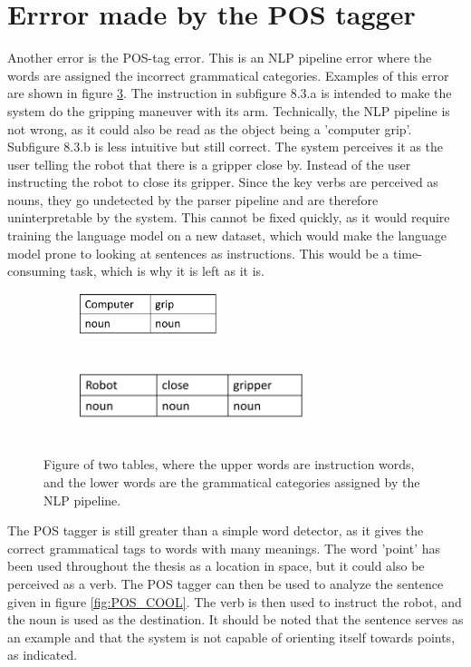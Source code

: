 \section{Errror made by the POS tagger}
Another error is the POS-tag error. This is an NLP pipeline error where the words are assigned the incorrect grammatical categories. Examples of this error are shown in figure \ref{fig:POS_TAG_ERROR}. The instruction in subfigure 8.3.a is intended to make the system do the gripping maneuver with its arm. Technically, the NLP pipeline is not wrong, as it could also be read as the object being a 'computer grip'. Subfigure 8.3.b is less intuitive but still correct. The system perceives it as the user telling the robot that there is a gripper close by. Instead of the user instructing the robot to close its gripper. Since the key verbs are perceived as nouns, they go undetected by the parser pipeline and are therefore uninterpretable by the system. This cannot be fixed quickly, as it would require training the language model on a new dataset, which would make the language model prone to looking at sentences as instructions. This would be a time-consuming task, which is why it is left as it is.

\begin{figure}[ht]
    \centering
    \begin{subfigure}[b]{9cm}
        \centering
        \includegraphics[width=4cm]{img/POS_tag_error.png}
        \caption{$ $}
        \label{fig:POS_error_1}
    \end{subfigure}
    \begin{subfigure}[b]{9cm}
        \centering
        \includegraphics[width=6.5cm]{img/robot_close_gripper_POS_error.png}
        \caption{$ $}
        \label{fig:POS_error_2}
    \end{subfigure}

       \caption{Figure of two tables, where the upper words are instruction words, and the lower words are the grammatical categories assigned by the NLP pipeline.}
       \label{fig:POS_TAG_ERROR}
\end{figure}


The POS tagger is still greater than a simple word detector, as it gives the correct grammatical tags to words with many meanings. The word 'point' has been used throughout the thesis as a location in space, but it could also be perceived as a verb. The POS tagger can then be used to analyze the sentence given in figure \ref{fig:POS_COOL}. The verb is then used to instruct the robot, and the noun is used as the destination. It should be noted that the sentence serves as an example and that the system is not capable of orienting itself towards points, as indicated.

